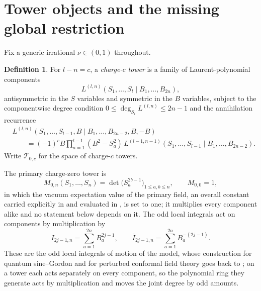 \documentclass[11pt,reqno]{amsart}
\theoremstyle{plain}
\theoremstyle{definition}
\newtheorem{definition}[theorem]{Definition}
\theoremstyle{remark}
\numberwithin{equation}{section}
\begin{document}
\section{Tower objects and the missing global restriction}
\label{sec:towers}

Fix a generic irrational $\nu\in(0,1)$ throughout.

\begin{definition}
  \label{def:tower}
  For $l-n=c$, a \emph{charge-$c$ tower} is a family of Laurent-polynomial
  components
  \begin{equation*}
    L^{(l,n)}(S_1,\dots,S_l\mid B_1,\dots,B_{2n}),
  \end{equation*}
  antisymmetric in the $S$ variables and symmetric in the $B$ variables,
  subject to the componentwise degree condition
  $0\le\deg_{S_i}L^{(l,n)}\le2n-1$ and the annihilation recurrence
  \begin{equation}
    \label{eq:recurrence}
    \begin{aligned}
      &L^{(l,n)}(S_1,\dots,S_{l-1},B\mid B_1,\dots,B_{2n-2},B,-B)\\
      &\qquad=(-1)^cB\prod_{a=1}^{l-1}(B^2-S_a^2)\,
        L^{(l-1,n-1)}(S_1,\dots,S_{l-1}\mid B_1,\dots,B_{2n-2}).
    \end{aligned}
  \end{equation}
  Write $\mathcal T_{0,c}$ for the space of charge-$c$ towers.
\end{definition}

The primary charge-zero tower is
\begin{equation}
  \label{eq:primary}
  M_{0,n}(S_1,\dots,S_n)=\det\bigl(S_a^{2b-1}\bigr)_{1\le a,b\le n},
  \qquad M_{0,0}=1,
\end{equation}
in which the vacuum expectation value of the primary field, an overall
constant carried explicitly in \cite{Jimbo_2011fs} and evaluated in
\cite{Lukyanov_1997ee}, is set to
one; it multiplies every component alike and no statement below depends on it.
The odd local integrals act on components by multiplication by
\begin{equation}
  \label{eq:integrals}
  I_{2j-1,n}=\sum_{a=1}^{2n}B_a^{2j-1},
  \qquad
  \overline I_{2j-1,n}=\sum_{a=1}^{2n}B_a^{-(2j-1)} .
\end{equation}
These are the odd local integrals of motion of the model, whose construction
for quantum sine--Gordon and for perturbed conformal field theory goes back to
\cite{Sasaki_1988va,Eguchi_1989do,Zamolodchikov_1989if}; on a tower each acts
separately on every component, so the polynomial ring they generate acts by
multiplication and moves the joint degree by odd amounts.
\end{document}
